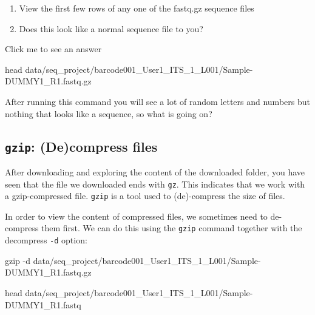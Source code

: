 \documentclass[
  letterpaper,
  DIV=11,
  numbers=noendperiod]{scrreprt}
\newenvironment{Shaded}{}{}
\newcommand{\AttributeTok}[1]{\textcolor[rgb]{0.84,0.23,0.29}{#1}}
\newcommand{\FunctionTok}[1]{\textcolor[rgb]{0.44,0.26,0.76}{#1}}
\newcommand{\NormalTok}[1]{\textcolor[rgb]{0.14,0.16,0.18}{#1}}
\providecommand{\tightlist}{%
  \setlength{\itemsep}{0pt}\setlength{\parskip}{0pt}}\usepackage{longtable,booktabs,array}
\begin{document}
\begin{tcolorbox}[enhanced jigsaw, title=\textcolor{quarto-callout-caution-color}{\faFire}\hspace{0.5em}{Exercise}, colframe=quarto-callout-caution-color-frame, opacitybacktitle=0.6, rightrule=.15mm, arc=.35mm, left=2mm, colbacktitle=quarto-callout-caution-color!10!white, bottomrule=.15mm, leftrule=.75mm, toprule=.15mm, opacityback=0, bottomtitle=1mm, colback=white, toptitle=1mm, breakable, titlerule=0mm, coltitle=black]

\begin{enumerate}
\def\labelenumi{\arabic{enumi}.}
\tightlist
\item
  View the first few rows of any one of the fastq.gz sequence files
\item
  Does this look like a normal sequence file to you?
\end{enumerate}

Click me to see an answer

\begin{Shaded}
\begin{Highlighting}[]
\FunctionTok{head}\NormalTok{ data/seq\_project/barcode001\_User1\_ITS\_1\_L001/Sample{-}DUMMY1\_R1.fastq.gz}
\end{Highlighting}
\end{Shaded}

After running this command you will see a lot of random letters and
numbers but nothing that looks like a sequence, so what is going on?

\end{tcolorbox}

\subsection{\texorpdfstring{\texttt{gzip}: (De)compress
files}{gzip: (De)compress files}}\label{gzip-decompress-files}

After downloading and exploring the content of the downloaded folder,
you have seen that the file we downloaded ends with \texttt{gz}. This
indicates that we work with a gzip-compressed file. \texttt{gzip} is a
tool used to (de)-compress the size of files.

In order to view the content of compressed files, we sometimes need to
de-compress them first. We can do this using the \texttt{gzip} command
together with the decompress \texttt{-d} option:

\begin{Shaded}
\begin{Highlighting}[]
\FunctionTok{gzip} \AttributeTok{{-}d}\NormalTok{ data/seq\_project/barcode001\_User1\_ITS\_1\_L001/Sample{-}DUMMY1\_R1.fastq.gz}

\FunctionTok{head}\NormalTok{ data/seq\_project/barcode001\_User1\_ITS\_1\_L001/Sample{-}DUMMY1\_R1.fastq}
\end{Highlighting}
\end{Shaded}
\end{document}
